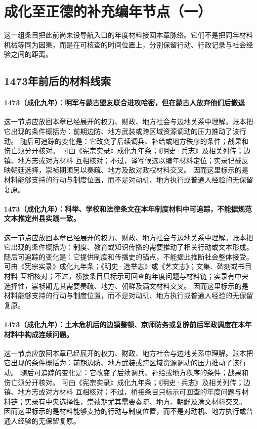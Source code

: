 \section{成化至正德的补充编年节点（一）}
这一组条目把此前尚未设导航入口的年度材料接回本章脉络。它们不是把同年材料机械等同为因果，而是在可核查的时间位置上，分别保留行动、行政记录与社会经验之间的距离。

\subsection{1473年前后的材料线索}

\paragraph{1473（成化九年）：明军与蒙古盟友联合进攻哈密，但在蒙古人放弃他们后撤退} 这一节点应放回本章已经展开的权力、财政、地方社会与边地关系中理解。账本把它出现的条件概括为：前期边防、地方武装或跨区域资源调动的压力推动了该行动。 随后可追踪的变化是：它改变了后续调兵、补给或地方秩序的条件；战果和伤亡须分开核对。 可由《宪宗实录》成化九年条；《明史·兵志》及相关列传；边镇、地方志或对方材料 互相核对；不过，译写候选以编年材料定位；实录记载反映朝廷选择，崇祯期须另以奏疏、地方及敌对政权材料交叉。 因而这里标示的是材料能够支持的行动与制度位置，而不是对动机、地方执行或普通人经验的无保留复原。

\paragraph{1473（成化九年）：科举、学校和法律条文在本年制度材料中可追踪，不能据规范文本推定州县实践一致。} 这一节点应放回本章已经展开的权力、财政、地方社会与边地关系中理解。账本把它出现的条件概括为：制度、教育或知识传播的需要推动了相关行动或文本形成。 随后可追踪的变化是：它提供制度和传播史的锚点，不能据此推断社会整体接受。 可由《宪宗实录》成化九年条；《明史·选举志》或《艺文志》；文集、碑刻或书目材料 互相核对；不过，桥接条目只标示可回查的年度问题与材料链；实录有中央选择性，崇祯期尤其需要奏疏、地方、朝鲜及满文材料交叉。 因而这里标示的是材料能够支持的行动与制度位置，而不是对动机、地方执行或普通人经验的无保留复原。

\paragraph{1473（成化九年）：土木危机后的边镇整顿、京师防务或复辟前后军政调度在本年材料中构成连续问题。} 这一节点应放回本章已经展开的权力、财政、地方社会与边地关系中理解。账本把它出现的条件概括为：前期边防、地方武装或跨区域资源调动的压力推动了该行动。 随后可追踪的变化是：它改变了后续调兵、补给或地方秩序的条件；战果和伤亡须分开核对。 可由《宪宗实录》成化九年条；《明史·兵志》及相关列传；边镇、地方志或对方材料 互相核对；不过，桥接条目只标示可回查的年度问题与材料链；实录有中央选择性，崇祯期尤其需要奏疏、地方、朝鲜及满文材料交叉。 因而这里标示的是材料能够支持的行动与制度位置，而不是对动机、地方执行或普通人经验的无保留复原。

